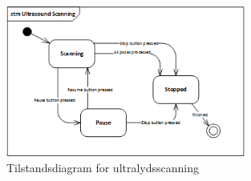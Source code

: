 \begin{figure}[H]
    \centering
    \includegraphics[width=0.7\textwidth]{figurer/d/Design/stm_UC3}
    \caption{Tilstandsdiagram for ultralydsscanning}
    \label{stm_Ultra}
\end{figure}



